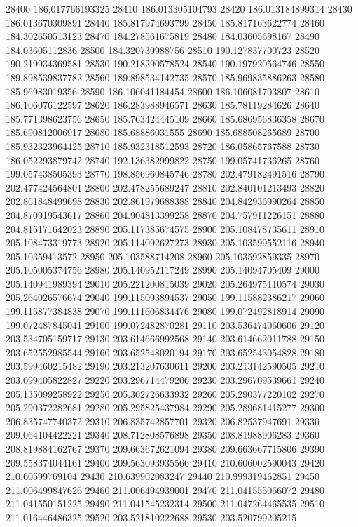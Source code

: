 {28400 186.017766193325
28410 186.013305104793
28420 186.013184899314
28430 186.013670309891
28440 185.817974693799
28450 185.817163622774
28460 184.302650513123
28470 184.278561675819
28480 184.03605698167
28490 184.03605112836
28500 184.320739988756
28510 190.127837700723
28520 190.219934369581
28530 190.218290578524
28540 190.197920564746
28550 189.898539837782
28560 189.898534142735
28570 185.969835886263
28580 185.96983019356
28590 186.106041184454
28600 186.106081703807
28610 186.106076122597
28620 186.283988946571
28630 185.78119284626
28640 185.771398623756
28650 185.763424445109
28660 185.686956836358
28670 185.690812006917
28680 185.68886031555
28690 185.688508265689
28700 185.932323964425
28710 185.932318512593
28720 186.05865767588
28730 186.052293879742
28740 192.136382999822
28750 199.05741736265
28760 199.057438505393
28770 198.856960845746
28780 202.479182491516
28790 202.477424564801
28800 202.478255689247
28810 202.840101213493
28820 202.861848499698
28830 202.861979688388
28840 204.842936990264
28850 204.870919543617
28860 204.904813399258
28870 204.757911226151
28880 204.815171642023
28890 205.117385674575
28900 205.108478735611
28910 205.108473319773
28920 205.114092627273
28930 205.103599552116
28940 205.10359413572
28950 205.103588714208
28960 205.103592859335
28970 205.105005374756
28980 205.140952117249
28990 205.14094705409
29000 205.140941989394
29010 205.221200815039
29020 205.264975110574
29030 205.264026576674
29040 199.115093894537
29050 199.115882386217
29060 199.115877384838
29070 199.111606834476
29080 199.072492818914
29090 199.072487845041
29100 199.072482870281
29110 203.536474060606
29120 203.534705159717
29130 203.614666992568
29140 203.614662011788
29150 203.652552985544
29160 203.652548020194
29170 203.652543054828
29180 203.599460215482
29190 203.213207630611
29200 203.213142590505
29210 203.099405822827
29220 203.296714479206
29230 203.296709539661
29240 205.135099258922
29250 205.302726633932
29260 205.290377220102
29270 205.290372282681
29280 205.295825437984
29290 205.289681415277
29300 206.835747740372
29310 206.835742857701
29320 206.82537947691
29330 209.064104422221
29340 208.712808576898
29350 208.81988906283
29360 208.819884162767
29370 209.663672621094
29380 209.663667715806
29390 209.558374044161
29400 209.563093935566
29410 210.606002590043
29420 210.60599769104
29430 210.639902083247
29440 210.999319462851
29450 211.006499847626
29460 211.006494939001
29470 211.041555066072
29480 211.041550151225
29490 211.041545232314
29500 211.047264465535
29510 211.016446486325
29520 203.521810222688
29530 203.520799205215
}
